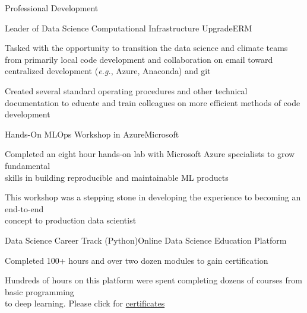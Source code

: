 \documentclass{resume} %
\begin{document}
\begin{rSection}{Professional Development} 
\begin{rSubsection}{Leader of Data Science Computational Infrastructure Upgrade}{}{ERM}{}
\item {Tasked with the opportunity to transition the data science and climate teams from primarily local code development and collaboration on email toward centralized development (\emph{e.g.}, Azure, Anaconda) and git}
\item {Created several standard operating procedures and other technical documentation to educate and train colleagues on more efficient methods of code development}
\end{rSubsection}


\begin{rSubsection}{Hands-On MLOps Workshop in Azure}{}{Microsoft}{}
\item {Completed an eight hour hands-on lab with Microsoft Azure specialists to grow fundamental \\ skills in building reproducible and maintainable ML products}
\item {This workshop was a stepping stone in developing the experience to becoming an end-to-end \\ concept to production data scientist}
\end{rSubsection}


\begin{rSubsection}{Data Science Career Track (Python)}{}{Online Data Science Education Platform}{}
\item {Completed 100+ hours and over two dozen modules to gain certification}
\item {Hundreds of hours on this platform were spent completing dozens of courses from basic programming \\ to deep learning. Please click for \href{https://github.com/907Resident/Certifications}{certificates}}
\end{rSubsection}




\end{rSection} 
\end{document}
